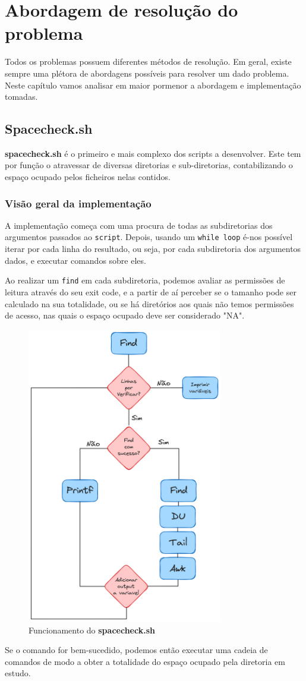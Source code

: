 \chapter{Abordagem de resolução do problema}
Todos os problemas possuem diferentes métodos de resolução. Em geral, existe sempre uma plétora de abordagens possíveis
para resolver um dado problema. Neste capítulo vamos
analisar em maior pormenor a abordagem e implementação
tomadas.
\section{Spacecheck.sh}
\textbf{spacecheck.sh} é o primeiro e mais complexo dos
scripts a desenvolver. Este tem por função o atravessar de
diversas diretorias e sub-diretorias, contabilizando o
espaço ocupado pelos ficheiros nelas contidos.
\subsection{Visão geral da implementação}
A implementação começa com uma procura de todas as
subdiretorias dos argumentos passados ao \verb|script|.
Depois, usando um \verb|while loop| é-nos possível iterar
por cada linha do resultado, ou seja, por cada subdiretoria
dos argumentos dados, e executar comandos sobre eles.

Ao realizar um \verb|find| em cada subdiretoria, podemos avaliar as
permissões de leitura através do seu exit code,
e a partir de aí perceber se o tamanho pode ser calculado na
sua totalidade, ou se há diretórios aos quais não temos
permissões de acesso, nas quais o espaço ocupado deve ser 
considerado "NA".
\begin{figure}[H]
    \centering
    \includegraphics[height=13cm]{Fluxograma_Implementacao.png}
    \caption{Funcionamento do \textbf{spacecheck.sh}}
\end{figure}
Se o comando for bem-sucedido, podemos então executar uma
cadeia de comandos de modo a obter a totalidade do espaço
ocupado pela diretoria em estudo.
